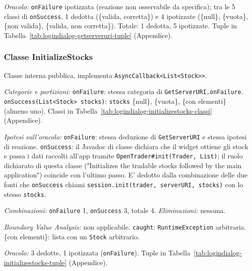 \textit{Oracolo:} \texttt{onFailure} ipotizzata (reazione non osservabile da specifica); tra le
5 classi di \texttt{onSuccess}, 1 dedotta (\{valida, corretta\}) e 4 ipotizzate (\{null\},
\{vuota\}, \{non valida\}, \{valida, non corretta\}). Totale: 1 dedotta, 5 ipotizzate. Tuple in
Tabella~\ref{tab:logindialog-getserveruri-tuple} (Appendice).

\subsubsection{Classe InitializeStocks}
\label{sec:logindialog-initializestocks-oracolo}

Classe interna pubblica, implementa \texttt{AsyncCallback<List<Stock>>}.

\textit{Categorie e partizioni:} \texttt{onFailure}: stessa categoria di
\texttt{GetServerURI.onFailure}. \texttt{onSuccess(List<Stock> stocks)}: \texttt{stocks}
\{null\}, \{vuota\}, \{con elementi\} (almeno uno). Classi in
Tabella~\ref{tab:logindialog-initializestocks-classi} (Appendice).

\textit{Ipotesi sull'oracolo:} \texttt{onFailure}: stessa deduzione di \texttt{GetServerURI} e stessa ipotesi di
reazione. \texttt{onSuccess}: il Javadoc di classe dichiara che il widget ottiene gli stock e
passa i dati raccolti all'app tramite \texttt{OpenTrader\#init(Trader, List)}; il ruolo
dichiarato di questa classe ("Initializes the tradable stocks followed by the main
application") coincide con l'ultimo passo. E' dedotto dalla combinazione delle due fonti che
\texttt{onSuccess} chiami \texttt{session.init(trader, serverURI, stocks)} con lo stesso
\texttt{stocks}.

\textit{Combinazioni:} \texttt{onFailure} 1, \texttt{onSuccess} 3, totale 4.
\textit{Eliminazioni:} nessuna.

\textit{Boundary Value Analysis:} non applicabile. \texttt{caught}: \texttt{RuntimeException}
arbitraria. \{con elementi\}: lista con un \texttt{Stock} arbitrario.

\textit{Oracolo:} 3 dedotte, 1 ipotizzata (\texttt{onFailure}). Tuple in
Tabella~\ref{tab:logindialog-initializestocks-tuple} (Appendice).
